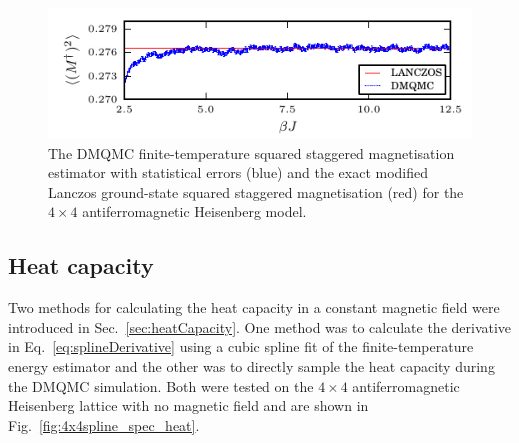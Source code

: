 \begin{figure}[H]
\begin{center}
\includegraphics[width =1\textwidth]{4x4_stag_mag_subplot.pdf}
\caption[The DMQMC finite-temperature squared staggered magnetisation estimator with statistical errors for the $4\times4$ antiferromagnetic Heisenberg model.]{The DMQMC finite-temperature squared staggered magnetisation estimator with statistical errors (blue) and the exact modified Lanczos ground-state squared staggered magnetisation (red) for the $4\times4$ antiferromagnetic Heisenberg model.}
\label{fig:4x4_nois_stag_mag_subplot}
\end{center}
\end{figure}


\subsection{Heat capacity}
\label{sec:HeatCapacityResults}
Two methods for calculating the heat capacity in a constant magnetic field were introduced in Sec.~\ref{sec:heatCapacity}. One method was to calculate the derivative in Eq.~\ref{eq:splineDerivative} using a cubic spline fit of the finite-temperature energy estimator and the other was to directly sample the heat capacity during the DMQMC simulation. Both were tested on the $4\times4$ antiferromagnetic Heisenberg lattice with no magnetic field and are shown in Fig.~\ref{fig:4x4spline_spec_heat}. 

